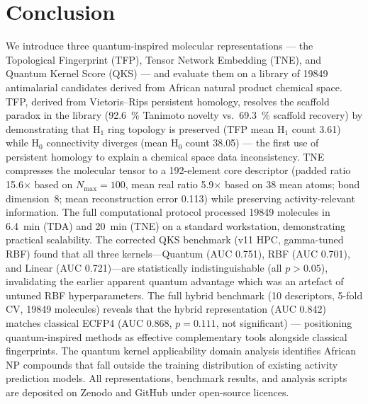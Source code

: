 \documentclass[11pt,a4paper]{article}
\begin{document}

\section{Conclusion}

We introduce three quantum-inspired molecular representations --- the Topological Fingerprint (TFP), Tensor Network Embedding (TNE), and Quantum Kernel Score (QKS) --- and evaluate them on a library of \num{19849} antimalarial candidates derived from African natural product chemical space. TFP, derived from Vietoris--Rips persistent homology, resolves the scaffold paradox in the library (\qty{92.6}{\percent} Tanimoto novelty vs.\ \qty{69.3}{\percent} scaffold recovery) by demonstrating that H$_1$ ring topology is preserved (TFP mean H$_1$ count 3.61) while H$_0$ connectivity diverges (mean H$_0$ count 38.05) --- the first use of persistent homology to explain a chemical space data inconsistency. TNE compresses the molecular tensor to a \num{192}-element core descriptor (padded ratio \num{15.6}$\times$ based on $N_{\max}=100$, mean real ratio \num{5.9}$\times$ based on \num{38} mean atoms; bond dimension~8; mean reconstruction error 0.113) while preserving activity-relevant information. The full computational protocol processed \num{19849} molecules in \SI{6.4}{\minute} (TDA) and \SI{20}{\minute} (TNE) on a standard workstation, demonstrating practical scalability. The corrected QKS benchmark (v11 HPC, gamma-tuned RBF) found that all three kernels---Quantum (AUC 0.751), RBF (AUC 0.701), and Linear (AUC 0.721)---are statistically indistinguishable (all $p > \num{0.05}$), invalidating the earlier apparent quantum advantage which was an artefact of untuned RBF hyperparameters. The full hybrid benchmark (10 descriptors, \num{5}-fold CV, \num{19849} molecules) reveals that the hybrid representation (AUC 0.842) matches classical ECFP4 (AUC 0.868, $p = \num{0.111}$, not significant) --- positioning quantum-inspired methods as effective complementary tools alongside classical fingerprints. The quantum kernel applicability domain analysis identifies African NP compounds that fall outside the training distribution of existing activity prediction models. All representations, benchmark results, and analysis scripts are deposited on Zenodo and GitHub under open-source licences.

\end{document}
